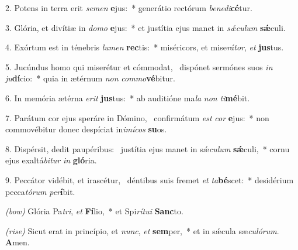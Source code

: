2. Potens in terra erit \textit{se}\textit{men} \textbf{e}jus:~* generátio rectórum \textit{be}\textit{ne}\textit{di}\textbf{cé}tur.

3. Glória, et divítiæ in \textit{do}\textit{mo} \textbf{e}jus:~* et justítia ejus manet in \textit{sǽ}\textit{cu}\textit{lum} \textbf{sǽ}culi.

4. Exórtum est in ténebris \textit{lu}\textit{men} \textbf{rec}tis:~* miséricors, et mise\textit{rá}\textit{tor}, \textit{et} \textbf{jus}tus.

5. Jucúndus homo qui miserétur et cómmodat,~{\color{red}\GreDagger} dispónet sermónes suos \textit{in} \textit{ju}\textbf{dí}cio:~* quia in ætérnum \textit{non} \textit{com}\textit{mo}\textbf{vé}bitur.

6. In memória ætérna \textit{e}\textit{rit} \textbf{jus}tus:~* ab auditióne ma\textit{la} \textit{non} \textit{ti}\textbf{mé}bit.

7. Parátum cor ejus speráre in Dómino,~{\color{red}\GreDagger} confirmátum \textit{est} \textit{cor} \textbf{e}jus:~* non commovébitur donec despíciat in\textit{i}\textit{mí}\textit{cos} \textbf{su}os.

8. Dispérsit, dedit paupéribus:~{\color{red}\GreDagger} justítia ejus manet in sǽ\textit{cu}\textit{lum} \textbf{sǽ}culi,~* cornu ejus exaltá\textit{bi}\textit{tur} \textit{in} \textbf{gló}ria.

9. Peccátor vidébit, et irascétur,~{\color{red}\GreDagger} déntibus suis fremet \textit{et} \textit{ta}\textbf{bé}scet:~* desidérium pecca\textit{tó}\textit{rum} \textit{per}\textbf{í}bit.

{\color{red}\textit{(bow)}} Glória Pa\textit{tri}, \textit{et} \textbf{Fí}lio,~* et Spi\textit{rí}\textit{tu}\textit{i} \textbf{Sanc}to.

{\color{red}\textit{(rise)}} Sicut erat in princípio, et \textit{nunc}, \textit{et} \textbf{sem}per,~* et in s\'{\ae}cula sæ\textit{cu}\textit{ló}\textit{rum}. \textbf{A}men.
